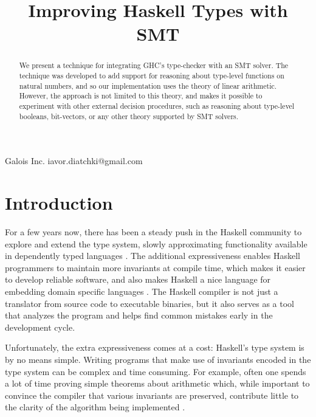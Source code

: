 \documentclass{sigplanconf}
\begin{document}
\setlength{\pdfpageheight}{\paperheight}
\setlength{\pdfpagewidth}{\paperwidth}



\title{Improving Haskell Types with SMT}

           {Galois Inc.}
           {iavor.diatchki@gmail.com}

\maketitle

\begin{abstract}
We present a technique for integrating GHC's type-checker with an SMT solver.
The technique was developed to add support for reasoning
about type-level functions on natural numbers, and so our implementation
uses the theory of linear arithmetic.  However, the approach is not
limited to this theory, and makes it possible to experiment with other
external decision procedures, such as reasoning about type-level booleans,
bit-vectors, or any other theory supported by SMT solvers.
\end{abstract}


\section{Introduction}

For a few years now, there has been a steady push in the Haskell
community to explore and extend the type system, slowly approximating
functionality available in dependently typed languages
\cite{Eisenberg2012,Lindley2013,Eisenberg2014}.  The additional
expressiveness enables Haskell programmers to maintain more
invariants at compile time, which makes it easier to develop
reliable software, and also makes Haskell a nice language
for embedding domain specific languages \cite{ivory-experience}.
The Haskell compiler is not just a translator from source code
to executable binaries, but it also serves as a tool that
analyzes the program and helps find common mistakes early
in the development cycle.

Unfortunately, the extra expressiveness comes at a cost:
Haskell's type system is by no means simple. Writing
programs that make use of invariants encoded in the
type system can be complex and time consuming.  For
example, often one spends a lot of time proving simple theorems
about arithmetic which, while important to convince the compiler
that various invariants are preserved, contribute little to
the clarity of the algorithm being implemented \cite{Lindley2013}.
\end{document}
